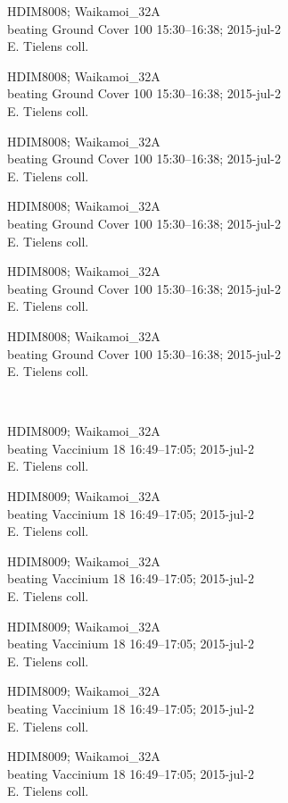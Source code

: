 \documentclass[2pt]{extarticle}
\begin{document}
\noindent
\parbox{0.16\textwidth}{\tiny \raggedright \rule[-0.3\baselineskip]{0pt}{10pt}HDIM8008; Waikamoi\_32A\\ beating Ground Cover 100 15:30--16:38; 2015-jul-2\\ E. Tielens coll.}
\parbox{0.16\textwidth}{\tiny \raggedright \rule[-0.3\baselineskip]{0pt}{10pt}HDIM8008; Waikamoi\_32A\\ beating Ground Cover 100 15:30--16:38; 2015-jul-2\\ E. Tielens coll.}
\parbox{0.16\textwidth}{\tiny \raggedright \rule[-0.3\baselineskip]{0pt}{10pt}HDIM8008; Waikamoi\_32A\\ beating Ground Cover 100 15:30--16:38; 2015-jul-2\\ E. Tielens coll.}
\parbox{0.16\textwidth}{\tiny \raggedright \rule[-0.3\baselineskip]{0pt}{10pt}HDIM8008; Waikamoi\_32A\\ beating Ground Cover 100 15:30--16:38; 2015-jul-2\\ E. Tielens coll.}
\parbox{0.16\textwidth}{\tiny \raggedright \rule[-0.3\baselineskip]{0pt}{10pt}HDIM8008; Waikamoi\_32A\\ beating Ground Cover 100 15:30--16:38; 2015-jul-2\\ E. Tielens coll.}
\parbox{0.16\textwidth}{\tiny \raggedright \rule[-0.3\baselineskip]{0pt}{10pt}HDIM8008; Waikamoi\_32A\\ beating Ground Cover 100 15:30--16:38; 2015-jul-2\\ E. Tielens coll.} \\ 
\vspace{0.001in} 

\noindent
\parbox{0.16\textwidth}{\tiny \raggedright \rule[-0.3\baselineskip]{0pt}{10pt}HDIM8009; Waikamoi\_32A\\ beating Vaccinium 18 16:49--17:05; 2015-jul-2\\ E. Tielens coll.}
\parbox{0.16\textwidth}{\tiny \raggedright \rule[-0.3\baselineskip]{0pt}{10pt}HDIM8009; Waikamoi\_32A\\ beating Vaccinium 18 16:49--17:05; 2015-jul-2\\ E. Tielens coll.}
\parbox{0.16\textwidth}{\tiny \raggedright \rule[-0.3\baselineskip]{0pt}{10pt}HDIM8009; Waikamoi\_32A\\ beating Vaccinium 18 16:49--17:05; 2015-jul-2\\ E. Tielens coll.}
\parbox{0.16\textwidth}{\tiny \raggedright \rule[-0.3\baselineskip]{0pt}{10pt}HDIM8009; Waikamoi\_32A\\ beating Vaccinium 18 16:49--17:05; 2015-jul-2\\ E. Tielens coll.}
\parbox{0.16\textwidth}{\tiny \raggedright \rule[-0.3\baselineskip]{0pt}{10pt}HDIM8009; Waikamoi\_32A\\ beating Vaccinium 18 16:49--17:05; 2015-jul-2\\ E. Tielens coll.}
\parbox{0.16\textwidth}{\tiny \raggedright \rule[-0.3\baselineskip]{0pt}{10pt}HDIM8009; Waikamoi\_32A\\ beating Vaccinium 18 16:49--17:05; 2015-jul-2\\ E. Tielens coll.} \\ 
\vspace{0.001in} 
\end{document}
